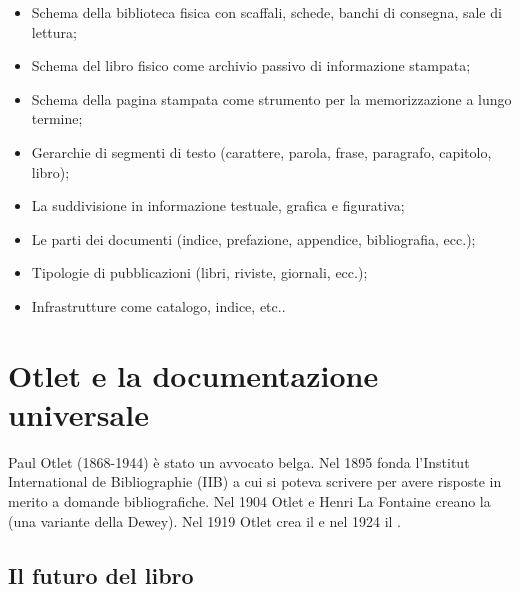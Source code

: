 \begin{itemize}
    \item [\textcolor{red}{\XSolidBrush}] Schema della biblioteca fisica con scaffali, schede, banchi di consegna, sale di lettura;
    \item [\textcolor{red}{\XSolidBrush}] Schema del libro fisico come archivio passivo di informazione stampata;
    \item [\textcolor{red}{\XSolidBrush}] Schema della pagina stampata come strumento per la memorizzazione a lungo termine;
    \item [\textcolor{green}{\Checkmark}] Gerarchie di segmenti di testo (carattere, parola, frase, paragrafo, capitolo, libro);
    \item [\textcolor{green}{\Checkmark}] La suddivisione in informazione testuale, grafica e figurativa;
    \item [\textcolor{green}{\Checkmark}] Le parti dei documenti (indice, prefazione, appendice, bibliografia, ecc.);
    \item [\textcolor{green}{\Checkmark}] Tipologie di pubblicazioni (libri, riviste, giornali, ecc.);
    \item [\textcolor{green}{\Checkmark}] Infrastrutture come catalogo, indice, etc..
\end{itemize}


\section{Otlet e la documentazione universale}

Paul Otlet (1868-1944) è stato un avvocato belga. Nel 1895 fonda l'Institut International de Bibliographie (IIB) a cui
si poteva scrivere per avere risposte in merito a domande bibliografiche. Nel 1904 Otlet e Henri La Fontaine creano 
la  (una variante della Dewey). Nel 1919 Otlet crea il 
e nel 1924 il .

\subsection{Il futuro del libro}

